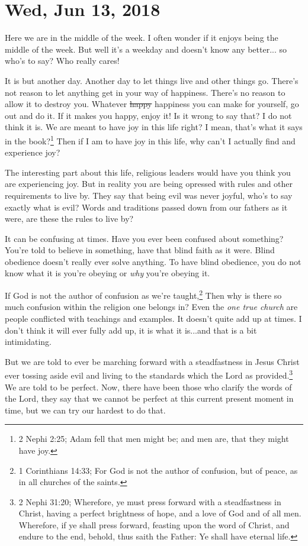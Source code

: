 \section{Wed, Jun 13, 2018}

Here we are in the middle of the week. I often wonder if it enjoys being the
middle of the week. But well it's a weekday and doesn't know any better... so
who's to say? Who really cares!

It is but another day. Another day to let things live and other things go.
There's not reason to let anything get in your way of happiness. There's no
reason to allow it to destroy you. Whatever \st{happy} happiness you can make 
for yourself, go out and do it. If it makes you happy, enjoy it! Is it wrong to
say that? I do not think it is. We are meant to have joy in this life right? I
mean, that's what it says in the book?\footnote{2 Nephi 2:25; Adam fell that 
men might be; and men are, that they might have joy.} Then if I am to have joy
in this life, why can't I actually find and experience joy?

The interesting part about this life, religious leaders would have you think you
are experiencing joy. But in reality you are being opressed with rules and other
requirements to live by. They say that being evil was never joyful, who's to say
exactly what is evil? Words and traditions passed down from our fathers as it
were, are these the rules to live by?

It can be confusing at times. Have you ever been confused about something?
You're told to believe in something, have that blind faith as it were. Blind
obedience doesn't really ever solve anything. To have blind obedience, you do
not know what it is you're obeying or \textit{why} you're obeying it.

If God is not the author of confusion as we're taught,\footnote{1 Corinthians 
14:33; For God is not the author of confusion, but of peace, as in all 
churches of the saints.} Then why is there so much confusion within the religion
one belongs in? Even the \textit{one true church} are people conflicted with
teachings and examples. It doesn't quite add up at times. I don't think it will
ever fully add up, it is what it is...and that is a bit intimidating.

But we are told to ever be marching forward with a steadfastness in Jesus
Christ ever tossing aside evil and living to the standards which the Lord as
provided.\footnote{2 Nephi 31:20; Wherefore, ye must press forward with a 
steadfastness in Christ, having a perfect brightness of hope, and a love of God 
and of all men. Wherefore, if ye shall press forward, feasting upon the word of 
Christ, and endure to the end, behold, thus saith the Father: Ye shall have 
eternal life.} We are told to be perfect. Now, there have been those who clarify
the words of the Lord, they say that we cannot be perfect at this current
present moment in time, but we can try our hardest to do that.

